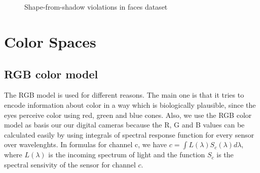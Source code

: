 \documentclass{article}
\begin{document}
\begin{enumerate}
    \begin{figure}[h]
        \centering
        \qquad
        \qquad
        \qquad
        \\
        \qquad
        \qquad
        \qquad
        \\
        \qquad
        \qquad
        \qquad
        \caption{Shape-from-shadow violations in faces dataset}
        \label{faces_violations}
    \end{figure}
    
\end{enumerate}

\section{Color Spaces}

\subsection{RGB color model}
	The RGB model is used for different reasons. The main one is that it tries to encode information about color in a way which is biologically plausible, since the eyes perceive color using red, green and blue cones. Also, we use the RGB color model as basis our our digital cameras because the R, G and B values can be calculated easily by using integrals of spectral response function for every sensor over wavelenghts. In formulas for channel c, we have $c = \int L(\lambda) S_c (\lambda) d \lambda $, where $L(\lambda)$ is the incoming spectrum of light and the function $S_c$ is the spectral sensivity of the sensor for channel $c$.
\end{document}
